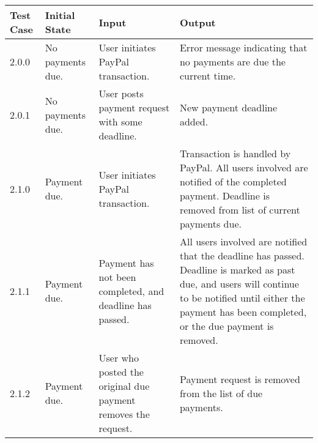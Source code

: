 \documentclass[12pt]{article}
\begin{document}
\begin{longtable}{|p{2cm}|p{3cm}|p{5cm}|p{5cm}|}
  \hline
  \textbf{Test Case} & \textbf{Initial State} & \textbf{Input} & \textbf{Output} \\ \hline
  2.0.0 & No payments due. & User initiates PayPal transaction. & Error message indicating that no payments are due the current time.\\
  \hline
  2.0.1 & No payments due. & User posts payment request with some deadline. & New payment deadline added.\\
  \hline
  2.1.0 & Payment due. & User initiates PayPal transaction. & Transaction is handled by PayPal. All users involved are notified of the completed payment. Deadline is removed from list of current payments due.\\
  \hline
  2.1.1 & Payment due. & Payment has not been completed, and deadline has passed. & All users involved are notified that the deadline has passed. Deadline is marked as past due, and users will continue to be notified until either the payment has been completed, or the due payment is removed.\\
  \hline
  2.1.2 & Payment due. & User who posted the original due payment removes the request. & Payment request is removed from the list of due payments.\\
  \hline
\end{longtable}
\end{document}

